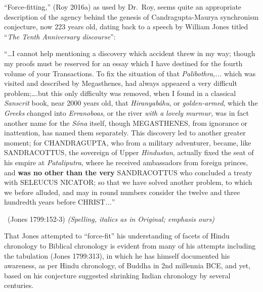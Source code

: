 “Force-fitting,” (Roy 2016a) as used by Dr.~Roy, seems quite an appropriate description of the agency behind the genesis of Candragupta-Maurya synchronism conjecture, now 223 years old, dating back to a speech by William Jones titled “\textit{The Tenth Anniversary discourse}”:

\begin{myquote}
“…I cannot help mentioning a discovery which accident threw in my way; though my proofs must be reserved for an essay which I have destined for the fourth volume of your Transactions. To fix the situation of that \textit{Palibothra,...} which was visited and described by Megasthenes, had always appeared a very difficult problem;….but this only difficulty was removed, when I found in a classical\textit{ Sanscrit} book, near 2000 years old, that \textit{Hiranyabáhu}, or \textit{golden-armed}, which the \textit{Greeks} changed into \textit{Erranoboas}, or the river \textit{with a} \textit{lovely murmur,} was in fact another name for the \textit{Sóna} itself, though MEGASTHENES, from ignorance or inattention, has named them separately. This discovery led to another greater moment; for CHANDRAGUPTA\textit{,} who from a military adventurer, became, like SANDRACOTTUS, the sovereign of Upper \textit{Hindustan}, actually fixed the seat of his empire at \textit{Pataliputra}, where he received ambassadors from foreign princes, and \textbf{was no other than the very} SANDRACOTTUS who concluded a treaty with SELEUCUS NICATOR; so that we have solved another problem, to which we before alluded, and may in round numbers consider the twelve and three hundredth years before CHRIST\textit{...}” 

~\hfill (Jones 1799:152-3) \textit{(Spelling, italics as in Original; emphasis ours)}
\end{myquote}

That Jones attempted to “force-fit” his understanding of facets of Hindu chronology to Biblical chronology is evident from many of his attempts including the tabulation (Jones 1799:313), in which he has himself documented his awareness, as per Hindu chronology, of Buddha in 2nd millennia BCE, and yet, based on his conjecture suggested shrinking Indian chronology by several centuries.

